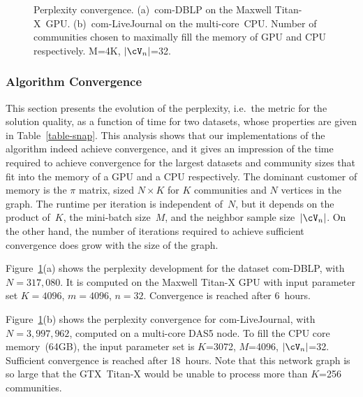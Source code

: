 
\begin{comment}
\begin{figure}[tb]	%
  \centering
  \epsfig{file=plots/ppx-gpu.eps, width=\columnwidth}
  \caption{Perplexity convergence of com-DBLP on the Maxwell \mbox{Titan-X}~GPU. Number
  of communities chosen to maximally fill the GPU memory.}
  \label{fig-ppx-gpu}
\end{figure}

\begin{figure}[tb]	%
  \centering
  \epsfig{file=plots/ppx-cpu.eps, width=\columnwidth}
  \caption{Perplexity convergence of com-LiveJournal on the multi-core~CPU.
  Number of communities chosen to maximally fill the CPU memory.}
  \label{fig-ppx-cpu}
\end{figure}
\end{comment}

\begin{figure}[tb]	%
  \centering
  \caption{Perplexity convergence. (a)~com-DBLP on the Maxwell \mbox{Titan-X}~GPU.
  (b)~com-LiveJournal on the multi-core~CPU. Number of communities chosen to
  maximally fill the memory of GPU and CPU respectively. M=4K, $|\Neighbors|$=32.}
  \label{fig-ppx-gpu-cpu}
\end{figure}

\subsubsection{Algorithm Convergence}

This section presents the evolution of the perplexity, i.e.\ the metric for
the solution quality, as a function of time for
two datasets, whose properties are given in Table~\ref{table-snap}. This
analysis shows that our implementations of the algorithm indeed achieve
convergence, and it gives an impression of the time required to achieve
convergence for the largest datasets and community sizes that fit into the memory
of a GPU and a CPU respectively. The dominant customer of memory is the
$\pi$ matrix, sized $N{\times}K$ for $K$ communities and $N$ vertices in the
graph. The runtime per iteration is independent of~$N$, but it depends on the
product of~$K$, the mini-batch size~$M$, and the neighbor sample size~$|\Neighbors|$. On
the other hand, the number of iterations required to achieve sufficient
convergence does grow with the size of the graph.

Figure~\ref{fig-ppx-gpu-cpu}(a) shows the perplexity development for the dataset
com-DBLP, with $N=317,080$. It is computed on the Maxwell \mbox{Titan-X} GPU with input
parameter set $K=4096$, $m=4096$, $n=32$. Convergence is reached after 6~hours.

Figure~\ref{fig-ppx-gpu-cpu}(b) shows the perplexity convergence for
com-LiveJournal, with $N=3,997,962$, computed on a multi-core DAS5 node.
To fill the CPU core memory~(64GB), the input parameter set is $K$=3072,
$M$=4096, $|\Neighbors|$=32. Sufficient convergence is reached after 18~hours. Note
that this network graph is so large that the GTX~\mbox{Titan-X} would be unable to
process more than $K$=256 communities.
